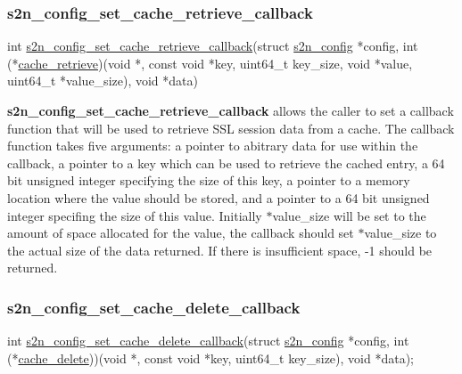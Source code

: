 \subsubsection*{s2n\+\_\+config\+\_\+set\+\_\+cache\+\_\+retrieve\+\_\+callback}


\begin{DoxyCode}
\textcolor{keywordtype}{int} \hyperlink{s2n_8h_ab1cd3ada52e3854db427d219a7183de2}{s2n\_config\_set\_cache\_retrieve\_callback}(\textcolor{keyword}{struct} 
      \hyperlink{structs2n__config}{s2n\_config} *config, \textcolor{keywordtype}{int} (*\hyperlink{s2nd_8c_a0153b562f602987e5668497ccb285868}{cache\_retrieve})(\textcolor{keywordtype}{void} *, \textcolor{keyword}{const} \textcolor{keywordtype}{void} *key, uint64\_t 
      key\_size, \textcolor{keywordtype}{void} *value, uint64\_t *value\_size), \textcolor{keywordtype}{void} *data)
\end{DoxyCode}


{\bfseries s2n\+\_\+config\+\_\+set\+\_\+cache\+\_\+retrieve\+\_\+callback} allows the caller to set a callback function that will be used to retrieve S\+SL session data from a cache. The callback function takes five arguments\+: a pointer to abitrary data for use within the callback, a pointer to a key which can be used to retrieve the cached entry, a 64 bit unsigned integer specifying the size of this key, a pointer to a memory location where the value should be stored, and a pointer to a 64 bit unsigned integer specifing the size of this value. Initially $\ast$value\+\_\+size will be set to the amount of space allocated for the value, the callback should set $\ast$value\+\_\+size to the actual size of the data returned. If there is insufficient space, -\/1 should be returned.

\subsubsection*{s2n\+\_\+config\+\_\+set\+\_\+cache\+\_\+delete\+\_\+callback}


\begin{DoxyCode}
\textcolor{keywordtype}{int} \hyperlink{s2n_8h_a5a13d9dc1fefcdd6c08c329e47f84e9e}{s2n\_config\_set\_cache\_delete\_callback}(\textcolor{keyword}{struct} 
      \hyperlink{structs2n__config}{s2n\_config} *config, \textcolor{keywordtype}{int} (*\hyperlink{s2nd_8c_a82dfd7cd8c27b3f6e78bc51538e81dce}{cache\_delete}))(\textcolor{keywordtype}{void} *, \textcolor{keyword}{const} \textcolor{keywordtype}{void} *key, uint64\_t key\_size),
       \textcolor{keywordtype}{void} *data);
\end{DoxyCode}



